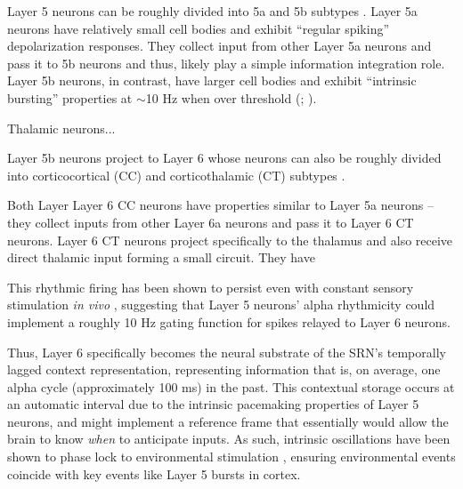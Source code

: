 \documentclass[dwyatte_dissertation.tex]{subfiles}
\begin{document}
%


Layer 5 neurons can be roughly divided into 5a and 5b subtypes \cite{ThomsonLamy07}. Layer 5a neurons have relatively small cell bodies and exhibit ``regular spiking'' depolarization responses. They collect input from other Layer 5a neurons and pass it to 5b neurons and thus, likely play a simple information integration role. Layer 5b neurons, in contrast, have larger cell bodies and exhibit ``intrinsic bursting'' properties at $\sim$10 Hz when over threshold (; ). %

Thalamic neurons...


Layer 5b neurons project to Layer 6 whose neurons can also be roughly divided into corticocortical (CC) and corticothalamic (CT) subtypes \cite{Thomson10}.

Both Layer Layer 6 CC neurons have properties similar to Layer 5a neurons -- they collect inputs from other Layer 6a neurons and pass it to Layer 6 CT neurons. Layer 6 CT neurons project specifically to the thalamus and also receive direct thalamic input forming a small circuit. They have 

This rhythmic firing has been shown to persist even with constant sensory stimulation \textit{in vivo} \cite{LuczakBarthoHarris13}, suggesting that Layer 5 neurons' alpha rhythmicity could implement a roughly 10 Hz gating function for spikes relayed to Layer 6 neurons. %

Thus, Layer 6 specifically becomes the neural substrate of the SRN's temporally lagged context representation, representing information that is, on average, one alpha cycle (approximately 100 ms) in the past. This contextual storage occurs at an automatic interval due to the intrinsic pacemaking properties of Layer 5 neurons, and might implement a reference frame that essentially would allow the brain to know \textit{when} to anticipate inputs. As such, intrinsic oscillations have been shown to phase lock to environmental stimulation \cite{WillBerg07,LakatosKarmosMehtaEtAl08,SchroederLakatos09,StefanicsHangyaHernadiEtAl10}, ensuring environmental events coincide with key events like Layer 5 bursts in cortex. %
\end{document}
